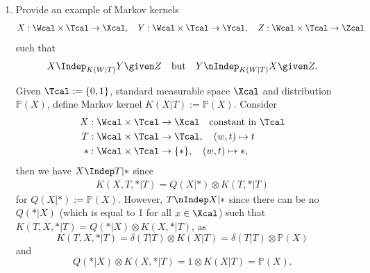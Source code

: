\begin{enumerate}
	\item %
	Provide an example of Markov kernels
	\begin{align*}
		X : \Wcal \times \Tcal \rightarrow \Xcal, \quad Y : \Wcal \times \Tcal \rightarrow \Ycal, \quad Z : \Wcal \times \Tcal \rightarrow \Zcal
	\end{align*}
	such that $$X \Indep_{K(W|T)} Y \given Z \quad \text{but} \quad Y \nIndep_{K(W|T)} X \given Z.$$
	\begin{ungradedsolution}
		Given $\Tcal := \{0,1\}$, standard measurable space $\Xcal$ and distribution $\mathbb{P}(X)$, define Markov kernel $K(X|T):=\mathbb{P}(X)$. Consider
		\begin{align*}
			X & : \Wcal \times \Tcal \rightarrow \Xcal \quad \text{constant in $\Tcal$} \\
			T & :\Wcal\times \Tcal \rightarrow \Tcal, \quad (w, t) \mapsto t            \\
			* & : \Wcal \times \Tcal \rightarrow \{*\}, \quad (w, t) \mapsto *,
		\end{align*}
		then we have $X\Indep T|*$ since
		\begin{align*}
			K(X, T, *|T) = Q(X|*) \otimes K(T, *|T)
		\end{align*}
		for $Q(X|*) := \mathbb{P}(X)$.  However, $T\nIndep X|*$ since there can be no $Q(*|X)$ (which is equal to 1 for all $x\in\Xcal$) such that $K(T, X, *|T) = Q(*|X)\otimes K(X, *|T)$, as
		$$K(T, X, *|T) = \delta(T|T)\otimes K(X|T) = \delta(T|T)\otimes \mathbb{P}(X)$$
		and
		$$Q(*|X)\otimes K(X, *|T) = 1\otimes K(X|T) = \mathbb{P}(X).$$
	\end{ungradedsolution}


\end{enumerate}
